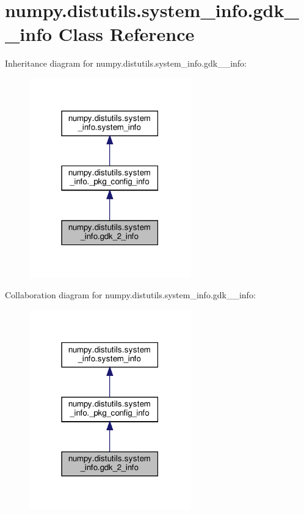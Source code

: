 \hypertarget{classnumpy_1_1distutils_1_1system__info_1_1gdk__2__info}{}\section{numpy.\+distutils.\+system\+\_\+info.\+gdk\+\_\+\_\+info Class Reference}
\label{classnumpy_1_1distutils_1_1system__info_1_1gdk__2__info}


Inheritance diagram for numpy.\+distutils.\+system\+\_\+info.\+gdk\+\_\+\_\+info\+:
\nopagebreak
\begin{figure}[H]
\begin{center}
\leavevmode
\includegraphics[width=198pt]{classnumpy_1_1distutils_1_1system__info_1_1gdk__2__info__inherit__graph}
\end{center}
\end{figure}


Collaboration diagram for numpy.\+distutils.\+system\+\_\+info.\+gdk\+\_\+\_\+info\+:
\nopagebreak
\begin{figure}[H]
\begin{center}
\leavevmode
\includegraphics[width=198pt]{classnumpy_1_1distutils_1_1system__info_1_1gdk__2__info__coll__graph}
\end{center}
\end{figure}

